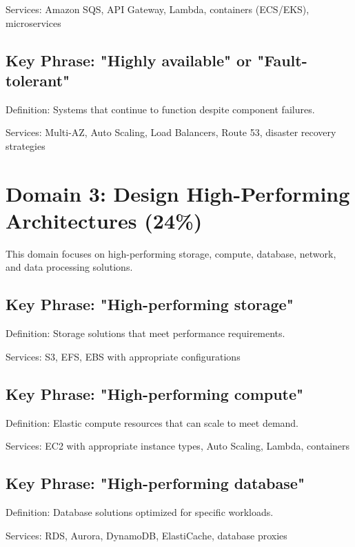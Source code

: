 \documentclass[11pt,a4paper]{report}
\begin{document}
Services: Amazon SQS, API Gateway, Lambda, containers (ECS/EKS), microservices



\section{Key Phrase: "Highly available" or "Fault-tolerant"}

Definition: Systems that continue to function despite component failures.

Services: Multi-AZ, Auto Scaling, Load Balancers, Route 53, disaster recovery strategies



\chapter{Domain 3: Design High-Performing Architectures (24\%)}

This domain focuses on high-performing storage, compute, database, network, and data processing solutions.



\section{Key Phrase: "High-performing storage"}

Definition: Storage solutions that meet performance requirements.

Services: S3, EFS, EBS with appropriate configurations



\section{Key Phrase: "High-performing compute"}

Definition: Elastic compute resources that can scale to meet demand.

Services: EC2 with appropriate instance types, Auto Scaling, Lambda, containers



\section{Key Phrase: "High-performing database"}

Definition: Database solutions optimized for specific workloads.

Services: RDS, Aurora, DynamoDB, ElastiCache, database proxies
\end{document}
